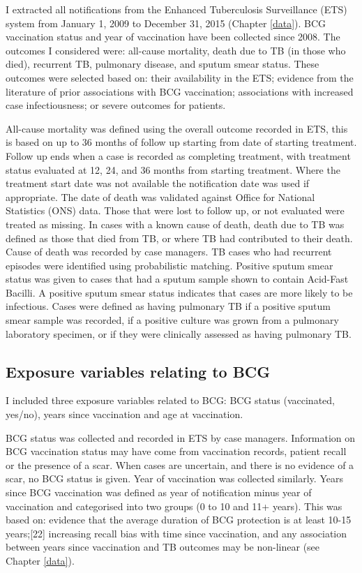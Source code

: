 \documentclass[11pt,twoside]{bristolthesis}
\begin{document}
  I extracted all notifications from the Enhanced Tuberculosis Surveillance (ETS) system from January 1, 2009 to December 31, 2015 (Chapter \ref{data}). BCG vaccination status and year of vaccination have been collected since 2008. The outcomes I considered were: all-cause mortality, death due to TB (in those who died), recurrent TB, pulmonary disease, and sputum smear status. These outcomes were selected based on: their availability in the ETS; evidence from the literature of prior associations with BCG vaccination; associations with increased case infectiousness; or severe outcomes for patients.
  
  All-cause mortality was defined using the overall outcome recorded in ETS, this is based on up to 36 months of follow up starting from date of starting treatment. Follow up ends when a case is recorded as completing treatment, with treatment status evaluated at 12, 24, and 36 months from starting treatment. Where the treatment start date was not available the notification date was used if appropriate. The date of death was validated against Office for National Statistics (ONS) data. Those that were lost to follow up, or not evaluated were treated as missing. In cases with a known cause of death, death due to TB was defined as those that died from TB, or where TB had contributed to their death. Cause of death was recorded by case managers. TB cases who had recurrent episodes were identified using probabilistic matching. Positive sputum smear status was given to cases that had a sputum sample shown to contain Acid-Fast Bacilli. A positive sputum smear status indicates that cases are more likely to be infectious. Cases were defined as having pulmonary TB if a positive sputum smear sample was recorded, if a positive culture was grown from a pulmonary laboratory specimen, or if they were clinically assessed as having pulmonary TB.
  
  \hypertarget{exposure-variables-relating-to-bcg}{%
  \subsection{Exposure variables relating to BCG}\label{exposure-variables-relating-to-bcg}}
  
  I included three exposure variables related to BCG: BCG status (vaccinated, yes/no), years since vaccination and age at vaccination.
  
  BCG status was collected and recorded in ETS by case managers. Information on BCG vaccination status may have come from vaccination records, patient recall or the presence of a scar. When cases are uncertain, and there is no evidence of a scar, no BCG status is given. Year of vaccination was collected similarly. Years since BCG vaccination was defined as year of notification minus year of vaccination and categorised into two groups (0 to 10 and 11+ years). This was based on: evidence that the average duration of BCG protection is at least 10-15 years;{[}22{]} increasing recall bias with time since vaccination, and any association between years since vaccination and TB outcomes may be non-linear (see Chapter \ref{data}).
  
\end{document}
